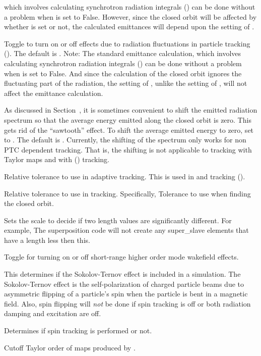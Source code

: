 {\begin{description}
which involves calculating synchrotron radiation integrals () can be done without
a problem when  is set to False. However, since the closed orbit will be
affected by whether  is set or not, the calculated emittances will depend
upon the setting of .
%
\item[\vn{radiation_fluctuations_on}] \Newline
Toggle to turn on or off effects due to radiation fluctuations in particle tracking
().  The default is . Note: The standard \bmad emittance calculation,
which involves calculating synchrotron radiation integrals () can be done without
a problem when  is set to False. And since the calculation of the closed orbit
ignores the fluctuating part of the radiation, the setting of , unlike the
setting of , will not affect the emittance calculation.
%
\item[\vn{radiation_zero_average}] \Newline
As discussed in Section~, it is sometimes convenient to shift the emitted radiation
spectrum so that the average energy emitted along the closed orbit is zero. This gets rid of the ``sawtooth''
effect. To shift the average emitted energy to zero, set  to . The
default is . Currently, the shifting of the spectrum only works for non PTC
dependent tracking. That is, the shifting is not applicable to tracking with Taylor maps and with
 () tracking.
%
\item[\vn{rel_tol_adaptive_tracking}] \Newline
Relative tolerance to use in adaptive tracking. This is used in  and
 tracking ().
%
\item[\vn{rel_tol_tracking}] \Newline
Relative tolerance to use in tracking. Specifically, Tolerance to use when finding the closed orbit.
%
\item[\vn{significant_length}] \Newline
Sets the scale to decide if two length values are significantly different. For example, The
superposition code will not create any super_slave elements that have a length less then this.
%
\item[\vn{sr_wakes_on}] \Newline
Toggle for turning on or off short-range higher order mode wakefield effects.
%
\item[\vn{spin_sokolov_ternov_flipping_on}] \Newline
This determines if the Sokolov-Ternov effect is included in a simulation.  The Sokolov-Ternov
effect\cite{b:barber99} is the self-polarization of charged particle beams due to asymmetric flipping
of a particle's spin when the particle is bent in a magnetic field. Also, spin flipping will {\em
not} be done if spin tracking is off or both radiation damping and excitation are off.
%
\item[\vn{spin_tracking_on}] \Newline
Determines if spin tracking is performed or not.
%
\item[\vn{taylor_order}] \Newline
Cutoff Taylor order of maps produced by .
\end{description}

}
